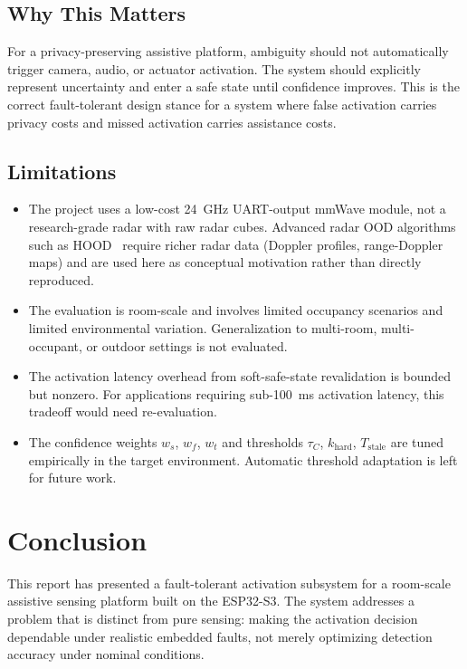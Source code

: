 \documentclass[12pt]{extarticle}
\begin{document}
\subsection{Why This Matters}

For a privacy-preserving assistive platform, ambiguity should not automatically trigger
camera, audio, or actuator activation.
The system should explicitly represent uncertainty and enter a safe state until
confidence improves.
This is the correct fault-tolerant design stance for a system where false activation
carries privacy costs and missed activation carries assistance costs.

\subsection{Limitations}

\begin{itemize}
  \item The project uses a low-cost 24~GHz UART-output mmWave module, not a
        research-grade radar with raw radar cubes.
        Advanced radar OOD algorithms such as HOOD~\cite{kahya2025hood} require
        richer radar data (Doppler profiles, range-Doppler maps) and are used here
        as conceptual motivation rather than directly reproduced.
  \item The evaluation is room-scale and involves limited occupancy scenarios and
        limited environmental variation.
        Generalization to multi-room, multi-occupant, or outdoor settings is not
        evaluated.
  \item The activation latency overhead from soft-safe-state revalidation is bounded
        but nonzero.
        For applications requiring sub-100~ms activation latency, this tradeoff would
        need re-evaluation.
  \item The confidence weights $w_s$, $w_f$, $w_t$ and thresholds $\tau_C$,
        $k_{\text{hard}}$, $T_{\text{stale}}$ are tuned empirically in the target
        environment.
        Automatic threshold adaptation is left for future work.
\end{itemize}

\section{Conclusion}
\label{sec:conclusion}

This report has presented a fault-tolerant activation subsystem for a room-scale
assistive sensing platform built on the ESP32-S3.
The system addresses a problem that is distinct from pure sensing: making the
activation decision dependable under realistic embedded faults, not merely optimizing
detection accuracy under nominal conditions.
\end{document}
